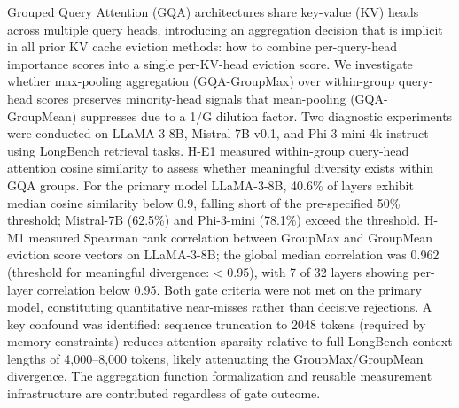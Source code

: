 
Grouped Query Attention (GQA) architectures share key-value (KV) heads across multiple query heads, introducing an aggregation decision that is implicit in all prior KV cache eviction methods: how to combine per-query-head importance scores into a single per-KV-head eviction score. We investigate whether max-pooling aggregation (GQA-GroupMax) over within-group query-head scores preserves minority-head signals that mean-pooling (GQA-GroupMean) suppresses due to a 1/G dilution factor. Two diagnostic experiments were conducted on LLaMA-3-8B, Mistral-7B-v0.1, and Phi-3-mini-4k-instruct using LongBench retrieval tasks. H-E1 measured within-group query-head attention cosine similarity to assess whether meaningful diversity exists within GQA groups. For the primary model LLaMA-3-8B, 40.6\% of layers exhibit median cosine similarity below 0.9, falling short of the pre-specified 50\% threshold; Mistral-7B (62.5\%) and Phi-3-mini (78.1\%) exceed the threshold. H-M1 measured Spearman rank correlation between GroupMax and GroupMean eviction score vectors on LLaMA-3-8B; the global median correlation was 0.962 (threshold for meaningful divergence: < 0.95), with 7 of 32 layers showing per-layer correlation below 0.95. Both gate criteria were not met on the primary model, constituting quantitative near-misses rather than decisive rejections. A key confound was identified: sequence truncation to 2048 tokens (required by memory constraints) reduces attention sparsity relative to full LongBench context lengths of 4,000--8,000 tokens, likely attenuating the GroupMax/GroupMean divergence. The aggregation function formalization and reusable measurement infrastructure are contributed regardless of gate outcome.

